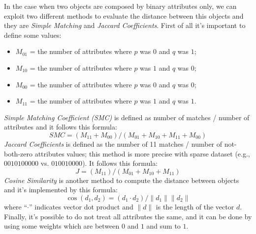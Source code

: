 In the case when two objects are composed by binary attributes only, we can exploit two different methods to evaluate the distance between this objects and they are \emph{Simple Matching} and \emph{Jaccard Coefficients}.
First of all it's important to define some values:
\begin{itemize}
	\item $M_{01}$ = the number of attributes where $p$ was $0$ and $q$ was $1$;
	\item $M_{10}$ = the number of attributes where $p$ was $1$ and $q$ was $0$;
	\item $M_{00}$ = the number of attributes where $p$ was $0$ and $q$ was $0$;
	\item $M_{11}$ = the number of attributes where $p$ was $1$ and $q$ was $1$.
\end{itemize}
\emph{Simple Matching Coefficient (SMC)} is defined as number of matches / number of attributes and it follows this formula:
$$
	SMC = (M_{11} + M_{00})/(M_{01} + M_{10} + M_{11} + M_{00})
$$
\emph{Jaccard Coefficients} is defined as the number of 11 matches / number of not-both-zero attributes values; this method is more precise with sparse dataset (e.g., $0010100000$ vs. $010010000$). It follows this formula:
$$
	J = (M_{11})/(M_{01} + M_{10} + M_{11})
$$
\emph{Cosine Similarity} is another method to compute the distance between objects and it's implemented by this formula:
$$
	\cos(d_1, d_2) = (d_1 \cdot d_2) / \|d_1\|\|d_2\|
$$
where ``$\cdot$'' indicates vector dot product and $\|d\|$ is the length of the vector $d$.
Finally, it's possible to do not treat all attributes the same, and it can be done by using some weights which are between $0$ and $1$ and sum to $1$.